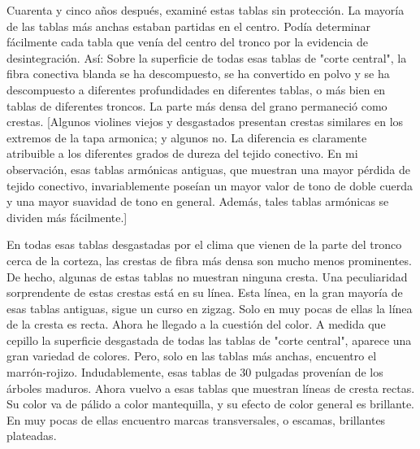 \documentclass[12pt]{book}
\begin{document}
Cuarenta y cinco años después, examiné estas tablas sin protección. La mayoría de las tablas más anchas estaban partidas en el centro. Podía determinar fácilmente cada tabla que venía del centro del tronco por la evidencia de desintegración. Así: Sobre la superficie de todas esas tablas de "corte central", la fibra conectiva blanda se ha descompuesto, se ha convertido en polvo y se ha descompuesto a diferentes profundidades en diferentes tablas, o más bien en tablas de diferentes troncos. La parte más densa del grano permaneció como crestas. [Algunos violines viejos y desgastados presentan crestas similares en los extremos de la tapa armonica; y algunos no. La diferencia es claramente atribuible a los diferentes grados de dureza del tejido conectivo. En mi observación, esas tablas armónicas antiguas, que muestran una mayor pérdida de tejido conectivo, invariablemente poseían un mayor valor de tono de doble cuerda y una mayor suavidad de tono en general. Además, tales tablas armónicas se dividen más fácilmente.]

En todas esas tablas desgastadas por el clima que vienen de la parte del tronco cerca de la corteza, las crestas de fibra más densa son mucho menos prominentes. De hecho, algunas de estas tablas no muestran ninguna cresta. Una peculiaridad sorprendente de estas crestas está en su línea. Esta línea, en la gran mayoría de esas tablas antiguas, sigue un curso en zigzag. Solo en muy pocas de ellas la línea de la cresta es recta. Ahora he llegado a la cuestión del color. A medida que cepillo la superficie desgastada de todas las tablas de "corte central", aparece una gran variedad de colores. Pero, solo en las tablas más anchas, encuentro el marrón-rojizo. Indudablemente, esas tablas de 30 pulgadas provenían de los árboles maduros. Ahora vuelvo a esas tablas que muestran líneas de cresta rectas. Su color va de pálido a color mantequilla, y su efecto de color general es brillante. En muy pocas de ellas encuentro marcas transversales, o escamas, brillantes plateadas.
\end{document}
